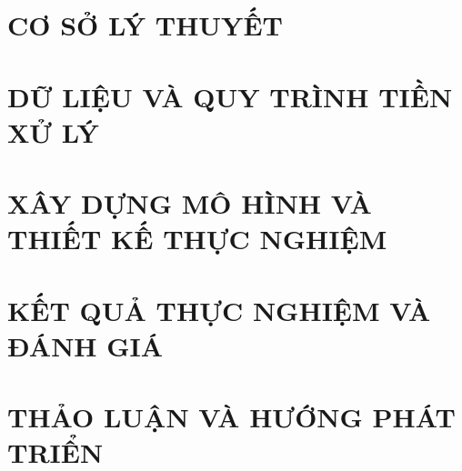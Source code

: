 \documentclass[a4paper,12pt,oneside]{report}
\begin{document}

\clearpage
\renewcommand{\contentsname}{MỤC LỤC}
\renewcommand{\listfigurename}{DANH SÁCH HÌNH VẼ}
\renewcommand{\listtablename}{DANH SÁCH BẢNG}
\tableofcontents
\clearpage

\clearpage
\listoffigures
\clearpage
\listoftables
\clearpage

\chapter{CƠ SỞ LÝ THUYẾT}
\label{chap:ly-thuyet}





\chapter{DỮ LIỆU VÀ QUY TRÌNH TIỀN XỬ LÝ}
\label{chap:dataset-eda}


\chapter{XÂY DỰNG MÔ HÌNH VÀ THIẾT KẾ THỰC NGHIỆM}
\label{chap:phuong-phap}


\chapter{KẾT QUẢ THỰC NGHIỆM VÀ ĐÁNH GIÁ}
\label{chap:ket-qua-thao-luan}




\chapter{THẢO LUẬN VÀ HƯỚNG PHÁT TRIỂN}
\label{chap:ban-luan}



\clearpage
{}
{}


\end{document}

